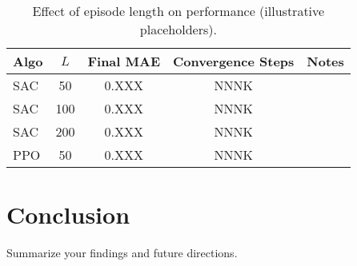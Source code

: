 \documentclass[11pt]{article}
\begin{document}
\begin{table}[h]
  \centering
  \caption{Effect of episode length on performance (illustrative placeholders).}
  \label{tab:chunks}
  \begin{tabular}{lcccc}
    \hline
    \textbf{Algo} & \textbf{$L$} & \textbf{Final MAE} & \textbf{Convergence Steps} & \textbf{Notes}\\
    \hline
    SAC  & 50  & 0.XXX & NNNK & \\
    SAC  & 100 & 0.XXX & NNNK & \\
    SAC  & 200 & 0.XXX & NNNK & \\
    PPO  & 50  & 0.XXX & NNNK & \\
    \hline
  \end{tabular}
\end{table}



\section{Conclusion}
Summarize your findings and future directions.
\end{document}
